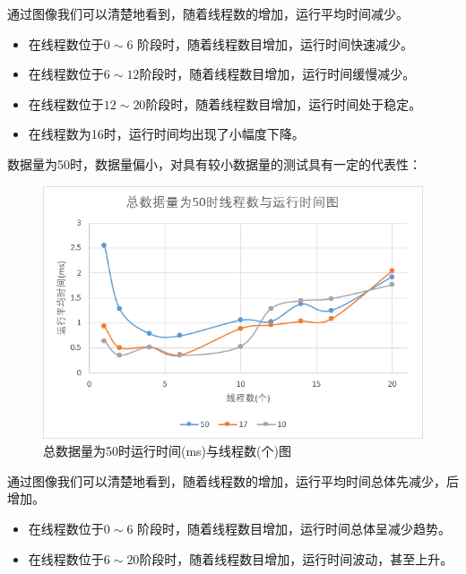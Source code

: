 \documentclass[UTF8]{ctexart}
\begin{document}
通过图像我们可以清楚地看到，随着线程数的增加，运行平均时间减少。
\begin{itemize}
    \item 在线程数位于$0 \sim 6$ 阶段时，随着线程数目增加，运行时间快速减少。
    \item 在线程数位于$6 \sim 12$阶段时，随着线程数目增加，运行时间缓慢减少。
    \item 在线程数位于$12 \sim 20$阶段时，随着线程数目增加，运行时间处于稳定。
    \item 在线程数为16时，运行时间均出现了小幅度下降。
\end{itemize}

数据量为50时，数据量偏小，对具有较小数据量的测试具有一定的代表性：

\begin{figure}[H]
    \centering
    \includegraphics[scale=0.7]{50.png}
    \caption{总数据量为50时运行时间(ms)与线程数(个)图}
\end{figure}

通过图像我们可以清楚地看到，随着线程数的增加，运行平均时间总体先减少，后增加。
\begin{itemize}
    \item 在线程数位于$0 \sim 6$ 阶段时，随着线程数目增加，运行时间总体呈减少趋势。
    \item 在线程数位于$6 \sim 20$阶段时，随着线程数目增加，运行时间波动，甚至上升。
\end{itemize}
\end{document}
